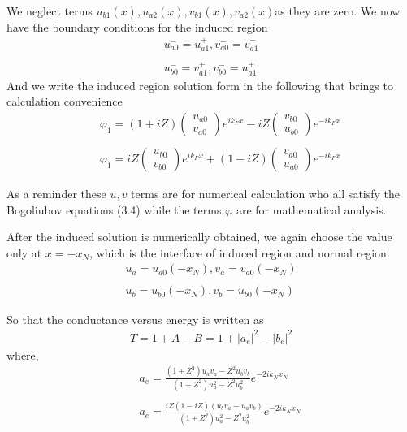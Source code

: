We neglect terms $u_{b1}(x), u_{a2}(x), v_{b1}(x), v_{a2}(x)$as they are zero. 
We now have the boundary conditions for the induced region
\begin{eqnarray}
u_{a0}^-=u_{a1}^+,v_{a0}^-=v_{a1}^+\nonumber\\
\\
u_{b0}^-=v_{a1}^+,v_{b0}^-=u_{a1}^+\nonumber
\end{eqnarray}
And we write the induced region solution form in the following that brings to calculation convenience
\begin{eqnarray}
&&\varphi_1=
(1+iZ)\left(
\begin{array}{c}
 u_{a0}\\
 v_{a0}
 \end{array}\right)e^{ik_Fx}-iZ\left(
\begin{array}{c}
 v_{b0}\\
 u_{b0}
 \end{array}\right)e^{-ik_Fx}\nonumber\\
&&\\
&&\varphi_1=
iZ\left(
\begin{array}{c}
 u_{b0}\\
 v_{b0}
 \end{array}\right)e^{ik_Fx}+(1-iZ)\left(
\begin{array}{c}
 v_{a0}\\
 u_{a0}
 \end{array}\right)e^{-ik_Fx}\nonumber
\end{eqnarray}

As a reminder these $u,v$ terms are for numerical calculation who all satisfy the Bogoliubov equations (3.4) while the terms $\varphi$ are for mathematical analysis.

After the induced solution is numerically obtained, we again choose the value only at $x=-x_N$, which is the interface of induced region and normal region.
\begin{eqnarray}
u_a=u_{a0}(-x_N),v_a=v_{a0}(-x_N)\nonumber\\
\\
u_b=u_{b0}(-x_N),v_b=u_{b0}(-x_N)\nonumber
\end{eqnarray}

So that the conductance versus energy is written as 
\begin{eqnarray}
T=1+A-B=1+\left\vert a_e\right\vert^2-\left\vert b_e\right\vert^2
\end{eqnarray}
where,
\begin{eqnarray}
&&a_e=\frac{(1+Z^2)u_av_a-Z^2u_bv_b}{(1+Z^2)u_a^2-Z^2u_b^2}e^{-2ik_Nx_N}\nonumber\\
&&\\
&&a_e=\frac{iZ(1-iZ)(u_bv_a-u_av_b)}{(1+Z^2)u_a^2-Z^2u_b^2}e^{-2ik_Nx_N}\nonumber
\end{eqnarray}

